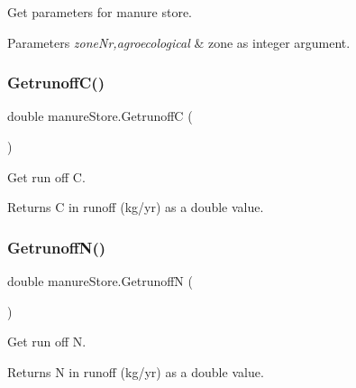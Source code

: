 Get parameters for manure store. 


\begin{DoxyParams}{Parameters}
{\em zone\+Nr,agroecological} & zone as integer argument. \\
\hline
\end{DoxyParams}
\mbox{\label{classmanure_store_aa996a044259ad5c54695a89f404d671a}} 
\subsubsection{\texorpdfstring{GetrunoffC()}{GetrunoffC()}}
{\footnotesize\ttfamily double manure\+Store.\+GetrunoffC (\begin{DoxyParamCaption}{ }\end{DoxyParamCaption})\hspace{0.3cm}{\ttfamily [inline]}}



Get run off C. 

\begin{DoxyReturn}{Returns}
C in runoff (kg/yr) as a double value. 
\end{DoxyReturn}
\mbox{\label{classmanure_store_ac69d09e89778d0b12e1b8d77542a8539}} 
\subsubsection{\texorpdfstring{GetrunoffN()}{GetrunoffN()}}
{\footnotesize\ttfamily double manure\+Store.\+GetrunoffN (\begin{DoxyParamCaption}{ }\end{DoxyParamCaption})\hspace{0.3cm}{\ttfamily [inline]}}



Get run off N. 

\begin{DoxyReturn}{Returns}
N in runoff (kg/yr) as a double value. 
\end{DoxyReturn}
\mbox{\label{classmanure_store_ad1ec2e50223e778b18e3a76ae6b5a627}} 
